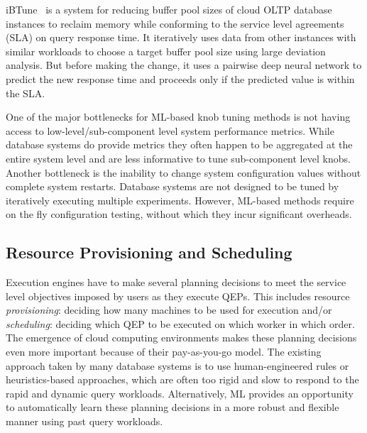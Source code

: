 iBTune~\cite{ibtune} is a system for reducing buffer pool sizes of cloud OLTP database instances to reclaim memory while conforming to the service level agreements (SLA) on query response time.
It iteratively uses data from other instances with similar workloads to choose a target buffer pool size using large deviation analysis.
But before making the change, it uses a pairwise deep neural network to predict the new response time and proceeds only if the predicted value is within the SLA.

One of the major bottlenecks for ML-based knob tuning methods is not having access to low-level/sub-component level system performance metrics.
While database systems do provide metrics they often happen to be aggregated at the entire system level and are less informative to tune sub-component level knobs.
Another bottleneck is the inability to change system configuration values without complete system restarts.
Database systems are not designed to be tuned by iteratively executing multiple experiments. 
However, ML-based methods require on the fly configuration testing, without which they incur significant overheads.

\subsection{Resource Provisioning and Scheduling}
Execution engines have to make several planning decisions to meet the service level objectives imposed by users as they execute QEPs.
This includes resource \textit{provisioning}: deciding how many machines to be used for execution and/or \textit{scheduling}: deciding which QEP to be executed on which worker in which order.
The emergence of cloud computing environments makes these planning decisions even more important because of their pay-as-you-go model.
The existing approach taken by many database systems is to use human-engineered rules or heuristics-based approaches, which are often too rigid and slow to respond to the rapid and dynamic query workloads.
Alternatively, ML provides an opportunity to automatically learn these planning decisions in a more robust and flexible manner using past query workloads.

